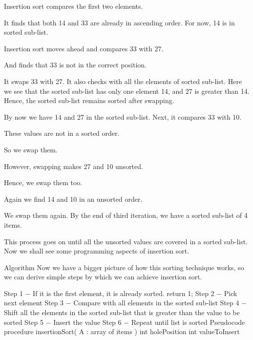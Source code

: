 Insertion sort compares the first two elements.



It finds that both 14 and 33 are already in ascending order. For now, 14 is in sorted sub-list.



Insertion sort moves ahead and compares 33 with 27.



And finds that 33 is not in the correct position.



It swaps 33 with 27. It also checks with all the elements of sorted sub-list. Here we see that the sorted sub-list has only one element 14, and 27 is greater than 14. Hence, the sorted sub-list remains sorted after swapping.



By now we have 14 and 27 in the sorted sub-list. Next, it compares 33 with 10.



These values are not in a sorted order.



So we swap them.



However, swapping makes 27 and 10 unsorted.



Hence, we swap them too.



Again we find 14 and 10 in an unsorted order.



We swap them again. By the end of third iteration, we have a sorted sub-list of 4 items.



This process goes on until all the unsorted values are covered in a sorted sub-list. Now we shall see some programming aspects of insertion sort.

Algorithm
Now we have a bigger picture of how this sorting technique works, so we can derive simple steps by which we can achieve insertion sort.

Step 1 − If it is the first element, it is already sorted. return 1;
Step 2 − Pick next element
Step 3 − Compare with all elements in the sorted sub-list
Step 4 − Shift all the elements in the sorted sub-list that is greater than the
         value to be sorted
Step 5 − Insert the value
Step 6 − Repeat until list is sorted
Pseudocode
procedure insertionSort( A : array of items )
   int holePosition
   int valueToInsert

